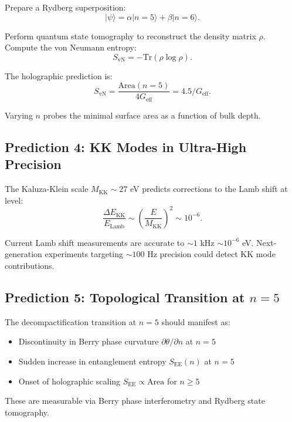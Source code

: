 \documentclass[aps,prd,twocolumn,superscriptaddress,floatfix]{revtex4-2}
\begin{document}
Prepare a Rydberg superposition:
\begin{equation}
|\psi\rangle = \alpha |n=5\rangle + \beta |n=6\rangle.
\end{equation}

Perform quantum state tomography to reconstruct the density matrix $\rho$. Compute the von Neumann entropy:
\begin{equation}
S_{\text{vN}} = -\text{Tr}(\rho \log \rho).
\end{equation}

The holographic prediction is:
\begin{equation}
S_{\text{vN}} = \frac{\text{Area}(n=5)}{4G_{\text{eff}}} = 4.5 / G_{\text{eff}}.
\end{equation}

Varying $n$ probes the minimal surface area as a function of bulk depth.

\subsection{Prediction 4: KK Modes in Ultra-High Precision}

The Kaluza-Klein scale $M_{\text{KK}} \sim 27$ eV predicts corrections to the Lamb shift at level:
\begin{equation}
\frac{\Delta E_{\text{KK}}}{E_{\text{Lamb}}} \sim \left(\frac{E}{M_{\text{KK}}}\right)^2 \sim 10^{-6}.
\end{equation}

Current Lamb shift measurements are accurate to $\sim 1$ kHz $\sim 10^{-6}$ eV. Next-generation experiments targeting $\sim 100$ Hz precision could detect KK mode contributions.

\subsection{Prediction 5: Topological Transition at $n=5$}

The decompactification transition at $n=5$ should manifest as:
\begin{itemize}
\item Discontinuity in Berry phase curvature $\partial \theta / \partial n$ at $n=5$
\item Sudden increase in entanglement entropy $S_{\text{EE}}(n)$ at $n=5$
\item Onset of holographic scaling $S_{\text{EE}} \propto \text{Area}$ for $n \geq 5$
\end{itemize}

These are measurable via Berry phase interferometry and Rydberg state tomography.
\end{document}
